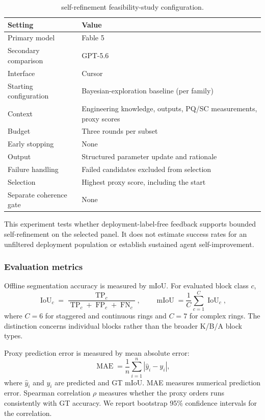 \documentclass[a4paper,fleqn]{cas-dc}
\begin{document}
{\begin{table}[ht]
\caption{self-refinement feasibility-study configuration.}
\label{tab:poc-config}
\centering
\begin{tabular}{p{} p{}}
\toprule
Setting & Value \\
\midrule
Primary model & Fable 5 \\
Secondary comparison & GPT-5.6 \\
Interface & Cursor \\
Starting configuration & Bayesian-exploration baseline (per family) \\
Context & Engineering knowledge, outputs, PQ/SC measurements, proxy scores \\
Budget & Three rounds per subset \\
Early stopping & None \\
Output & Structured parameter update and rationale \\
Failure handling & Failed candidates excluded from selection \\
Selection & Highest proxy score, including the start \\
Separate coherence gate & None \\
\bottomrule
\end{tabular}
\end{table}

This experiment tests whether deployment-label-free feedback supports bounded self-refinement on the selected panel. It does not estimate success rates for an unfiltered deployment population or establish sustained agent self-improvement.


\subsubsection{Evaluation metrics}
\label{sec:metrics}

Offline segmentation accuracy is measured by mIoU. For evaluated block class $c$,
\begin{equation}
\operatorname{IoU}_c
=
\frac{\operatorname{TP}_c}
{\operatorname{TP}_c+\operatorname{FP}_c+\operatorname{FN}_c},
\qquad
\operatorname{mIoU}
=
\frac{1}{C}\sum_{c=1}^{C}\operatorname{IoU}_c,
\end{equation}
where $C=6$ for staggered and continuous rings and $C=7$ for complex rings. The distinction concerns individual blocks rather than the broader K/B/A block types.

Proxy prediction error is measured by mean absolute error:
\begin{equation}
\operatorname{MAE}
=
\frac{1}{n}\sum_{i=1}^{n}
|\hat{y}_i-y_i|,
\end{equation}
where $\hat{y}_i$ and $y_i$ are predicted and GT mIoU. MAE measures numerical prediction error. Spearman correlation $\rho$ measures whether the proxy orders runs consistently with GT accuracy. We report bootstrap 95\% confidence intervals for the correlation.

}
\end{document}
